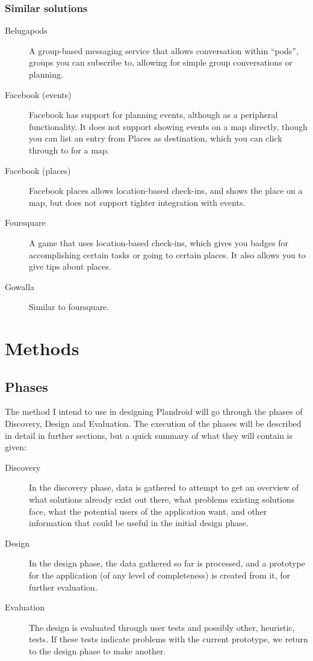 \documentclass[a4paper,11pt]{report}
\let\oldmarginpar\marginpar
\renewcommand\marginpar[1]{\-\oldmarginpar[\raggedleft\footnotesize #1]%
{\raggedright\footnotesize #1}}
\begin{document}
\subsection{Similar solutions}

\begin{description}
\item[Belugapods] A group-based messaging service that allows conversation
  within ``pods'', groups you can subscribe to, allowing for simple group
  conversations or planning.\cite{site:belugapods}
\item[Facebook (events)] Facebook has support for planning events, although as a
  peripheral functionality. It does not support showing events on a map
  directly, though you can list an entry from Places as destination, which you
  can click through to for a map.\cite{site:facebook}
\item[Facebook (places)] Facebook places allows location-based check-ins, and shows the
  place on a map, but does not support tighter integration with events.\cite{site:facebook}
\item[Foursquare] A game that uses location-based check-ins, which gives you
  badges for accomplishing certain tasks or going to certain places. It also
  allows you to give tips about places.\cite{site:foursquare}
\item[Gowalla] Similar to foursquare.\cite{site:gowalla}\marginpar{Fill out more here}
\end{description}

\chapter{Methods}

\section{Phases}

The method I intend to use in designing Plandroid will go through the phases of
Discovery, Design and Evaluation. The execution of the phases will be described
in detail in further sections, but a quick summary of what they will contain is
given:

\begin{description}
\item[Discovery] In the discovery phase, data is gathered to attempt to get an
  overview of what solutions already exist out there, what problems existing
  solutions face, what the potential users of the application want, and other
  information that could be useful in the initial design phase.
\item[Design] In the design phase, the data gathered so far is processed, and a
  prototype for the application (of any level of completeness) is created from
  it, for further evaluation.
\item[Evaluation] The design is evaluated through user tests and possibly other,
  heuristic, tests. If these tests indicate problems with the current prototype,
  we return to the design phase to make another.
\end{description}
\end{document}
